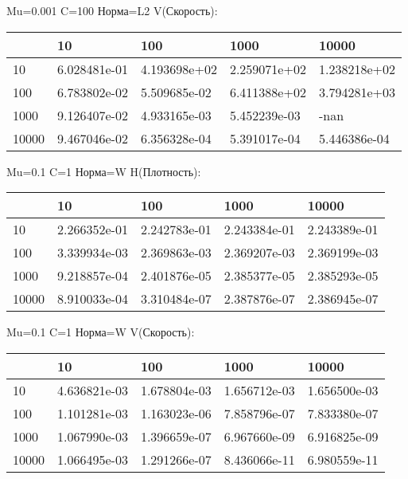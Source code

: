 \documentclass[a4paper, 12pt]{article}
\begin{document}
\bigskip
\bigskip
\bigskip


Mu=0.001  C=100 Норма=L2 V(Скорость):


\begin{tabular}{lllll}
\toprule
{} &         10    &         100   &         1000  &         10000 \\
\midrule
10    &  6.028481e-01 &  4.193698e+02 &  2.259071e+02 &  1.238218e+02 \\
100   &  6.783802e-02 &  5.509685e-02 &  6.411388e+02 &  3.794281e+03 \\
1000  &  9.126407e-02 &  4.933165e-03 &  5.452239e-03 &          -nan \\
10000 &  9.467046e-02 &  6.356328e-04 &  5.391017e-04 &  5.446386e-04 \\
\bottomrule
\end{tabular}



\bigskip
\bigskip
\bigskip


Mu=0.1  C=1 Норма=W H(Плотность):


\begin{tabular}{lllll}
\toprule
{} &         10    &         100   &         1000  &         10000 \\
\midrule
10    &  2.266352e-01 &  2.242783e-01 &  2.243384e-01 &  2.243389e-01 \\
100   &  3.339934e-03 &  2.369863e-03 &  2.369207e-03 &  2.369199e-03 \\
1000  &  9.218857e-04 &  2.401876e-05 &  2.385377e-05 &  2.385293e-05 \\
10000 &  8.910033e-04 &  3.310484e-07 &  2.387876e-07 &  2.386945e-07 \\
\bottomrule
\end{tabular}



\bigskip
\bigskip
\bigskip


Mu=0.1  C=1 Норма=W V(Скорость):


\begin{tabular}{lllll}
\toprule
{} &         10    &         100   &         1000  &         10000 \\
\midrule
10    &  4.636821e-03 &  1.678804e-03 &  1.656712e-03 &  1.656500e-03 \\
100   &  1.101281e-03 &  1.163023e-06 &  7.858796e-07 &  7.833380e-07 \\
1000  &  1.067990e-03 &  1.396659e-07 &  6.967660e-09 &  6.916825e-09 \\
10000 &  1.066495e-03 &  1.291266e-07 &  8.436066e-11 &  6.980559e-11 \\
\bottomrule
\end{tabular}
\end{document}
